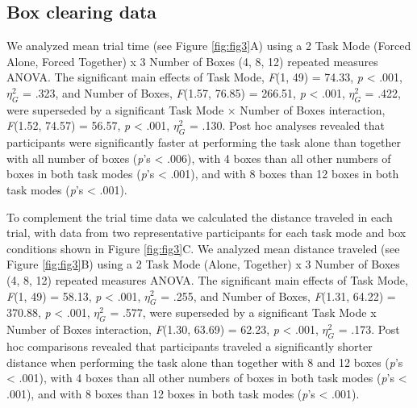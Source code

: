 \documentclass[
  man,
  floatsintext,
  longtable,
  nolmodern,
  notxfonts,
  notimes,
  mask,
  colorlinks=true,linkcolor=blue,citecolor=blue,urlcolor=blue]{apa7}
\begin{document}
\subsection{Box clearing data}\label{box-clearing-data-1}

We analyzed mean trial time (see Figure \ref{fig:fig3}A) using a 2 Task
Mode (Forced Alone, Forced Together) x 3 Number of Boxes (4, 8, 12)
repeated measures ANOVA. The significant main effects of Task Mode,
\emph{F}(1, 49) = 74.33, \emph{p} \textless{} .001, \(\eta_{G}^{2}\) =
.323, and Number of Boxes, \emph{F}(1.57, 76.85) = 266.51, \emph{p}
\textless{} .001, \(\eta_{G}^{2}\) = .422, were superseded by a
significant Task Mode × Number of Boxes interaction, \emph{F}(1.52,
74.57) = 56.57, \emph{p} \textless{} .001, \(\eta_{G}^{2}\) = .130. Post
hoc analyses revealed that participants were significantly faster at
performing the task alone than together with all number of boxes
(\emph{p}'s \textless{} .006), with 4 boxes than all other numbers of
boxes in both task modes (\emph{p}'s \textless{} .001), and with 8 boxes
than 12 boxes in both task modes (\emph{p}'s \textless{} .001).

To complement the trial time data we calculated the distance traveled in
each trial, with data from two representative participants for each task
mode and box conditions shown in Figure \ref{fig:fig3}C. We analyzed
mean distance traveled (see Figure \ref{fig:fig3}B) using a 2 Task Mode
(Alone, Together) x 3 Number of Boxes (4, 8, 12) repeated measures
ANOVA. The significant main effects of Task Mode, \emph{F}(1, 49) =
58.13, \emph{p} \textless{} .001, \(\eta_{G}^{2}\) = .255, and Number of
Boxes, \emph{F}(1.31, 64.22) = 370.88, \emph{p} \textless{} .001,
\(\eta_{G}^{2}\) = .577, were superseded by a significant Task Mode x
Number of Boxes interaction, \emph{F}(1.30, 63.69) = 62.23, \emph{p}
\textless{} .001, \(\eta_{G}^{2}\) = .173. Post hoc comparisons revealed
that participants traveled a significantly shorter distance when
performing the task alone than together with 8 and 12 boxes (\emph{p}'s
\textless{} .001), with 4 boxes than all other numbers of boxes in both
task modes (\emph{p}'s \textless{} .001), and with 8 boxes than 12 boxes
in both task modes (\emph{p}'s \textless{} .001).

\clearpage
\end{document}
